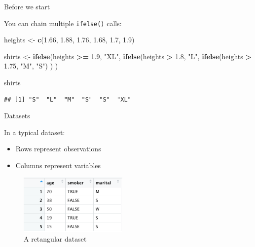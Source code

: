 \documentclass[ignorenonframetext,]{beamer}
\newenvironment{Shaded}{\begin{snugshade}}{\end{snugshade}}
\newcommand{\FloatTok}[1]{\textcolor[rgb]{0.00,0.00,0.81}{#1}}
\newcommand{\KeywordTok}[1]{\textcolor[rgb]{0.13,0.29,0.53}{\textbf{#1}}}
\newcommand{\NormalTok}[1]{#1}
\newcommand{\OperatorTok}[1]{\textcolor[rgb]{0.81,0.36,0.00}{\textbf{#1}}}
\newcommand{\StringTok}[1]{\textcolor[rgb]{0.31,0.60,0.02}{#1}}
\providecommand{\tightlist}{%
  \setlength{\itemsep}{0pt}\setlength{\parskip}{0pt}}
\begin{document}
\begin{frame}[fragile]{Before we start}
\protect\hypertarget{before-we-start-2}{}

You can chain multiple \texttt{ifelse()} calls:

\begin{Shaded}
\begin{Highlighting}[]
\NormalTok{heights <-}\StringTok{ }\KeywordTok{c}\NormalTok{(}\FloatTok{1.66}\NormalTok{, }\FloatTok{1.88}\NormalTok{, }\FloatTok{1.76}\NormalTok{, }\FloatTok{1.68}\NormalTok{, }\FloatTok{1.7}\NormalTok{, }\FloatTok{1.9}\NormalTok{)}

\NormalTok{shirts <-}\StringTok{ }\KeywordTok{ifelse}\NormalTok{(heights }\OperatorTok{>=}\StringTok{ }\FloatTok{1.9}\NormalTok{, }\StringTok{"XL"}\NormalTok{,}
                 \KeywordTok{ifelse}\NormalTok{(heights }\OperatorTok{>}\StringTok{ }\FloatTok{1.8}\NormalTok{, }\StringTok{"L"}\NormalTok{,}
                        \KeywordTok{ifelse}\NormalTok{(heights }\OperatorTok{>}\StringTok{ }\FloatTok{1.75}\NormalTok{, }\StringTok{"M"}\NormalTok{,}
                               \StringTok{"S"}\NormalTok{)}
\NormalTok{                        )}
\NormalTok{                 )}

\NormalTok{shirts}
\end{Highlighting}
\end{Shaded}

\begin{verbatim}
## [1] "S"  "L"  "M"  "S"  "S"  "XL"
\end{verbatim}

\end{frame}

\begin{frame}{Datasets}
\protect\hypertarget{datasets}{}

In a typical dataset:

\begin{itemize}
\tightlist
\item
  Rows represent observations
\item
  Columns represent variables
\end{itemize}

\begin{figure}
\centering
\includegraphics[width=2.08333in,height=\textheight]{figures/dataset}
\caption{A retangular dataset}
\end{figure}

\end{frame}
\end{document}
